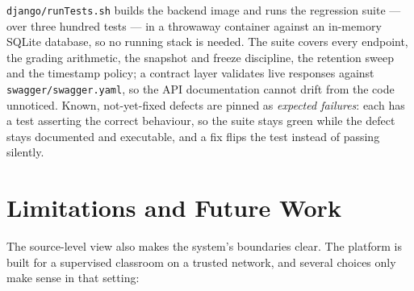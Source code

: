 \documentclass[11pt,a4paper]{article}
\newcommand{\code}[1]{\texttt{#1}}
\begin{document}
\code{django/runTests.sh} builds the backend image and runs the
regression suite --- over three hundred tests --- in a throwaway
container against an in-memory SQLite database, so no running stack is
needed. The suite covers every endpoint, the grading arithmetic, the
snapshot and freeze discipline, the retention sweep and the timestamp
policy; a contract layer validates live responses against
\code{swagger/swagger.yaml}, so the API documentation cannot drift from
the code unnoticed. Known, not-yet-fixed defects are pinned as
\emph{expected failures}: each has a test asserting the correct
behaviour, so the suite stays green while the defect stays documented
and executable, and a fix flips the test instead of passing silently.

\section{Limitations and Future Work}
\label{sec:limitations}

The source-level view also makes the system's boundaries clear. The
platform is built for a supervised classroom on a trusted network, and
several choices only make sense in that setting:
\end{document}
